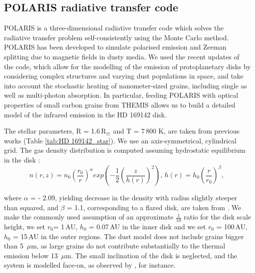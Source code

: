 \documentclass{aa}
\newcommand{\mic}{~$\mu$m\xspace}
\begin{document}
\subsection{POLARIS radiative transfer code} \label{sec:POLequations}
POLARIS is a three-dimensional radiative transfer code \citep{Reissl2016} which solves the radiative transfer problem self-consistently using the Monte Carlo method. POLARIS has been developed to simulate polarised emission and Zeeman splitting due to magnetic fields in dusty media. We used the recent updates of the code, which allow for the modelling of the emission of protoplanetary disks by considering complex structures and varying dust populations in space, and take into account the stochastic heating of nanometer-sized grains, including single as well as multi-photon absorption. In particular, feeding POLARIS with optical properties of small carbon grains from THEMIS allows us to build a detailed model of the infrared emission in the HD 169142 disk.

The stellar parameters, R = 1.6\,R$_{\astrosun}$ and T = 7\,800 K, are taken from previous works (Table \ref{tab:HD 169142_star}). We use an axis-symmetrical, cylindrical grid. The gas density distribution is computed assuming hydrostatic equilibrium in the disk \citep{Hayashi1981}:
\begin{equation} \label{eq:evasement}
n(r,z)=n_0 \left( \frac{r_0}{r} \right) ^\alpha exp \left( -\frac{1}{2} \left( \frac{z}{h(r)}\right) ^2 \right)
\text{, } h(r)=h_0 \left( \frac{r}{r_0} \right) ^\beta \text{, }
\end{equation}

where $\alpha$ = - 2.09, yielding decrease in the density with radius slightly steeper than squared, and $\beta$ = 1.1, corresponding to a flared disk, are taken from \citet{Monnier_2017}. We make the commonly used assumption of an approximate $\frac{1}{10}$ ratio for the disk scale height, we set $r_0$= 1\,AU, $h_0$ = 0.07\,AU in the inner disk and we set $r_0$ = 100\,AU, $h_0$ = 15\,AU in the outer regions. The dust model does not include grains bigger than 5\mic, as large grains do not contribute substantially to the thermal emission below 13\mic. The small inclination of the disk is neglected, and the system is modelled face-on, as observed by \citet{Panic2008}, for instance.
\end{document}
